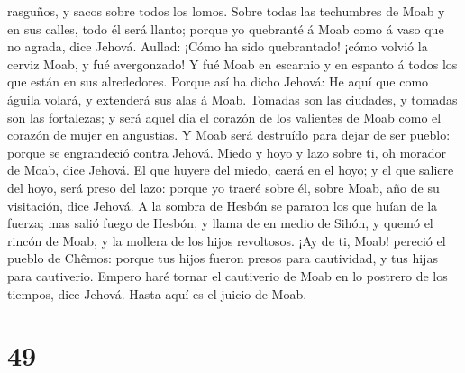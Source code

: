 rasguños, y sacos sobre todos los lomos.  Sobre todas las
techumbres de Moab y en sus calles, todo él será llanto; porque yo
quebranté á Moab como á vaso que no agrada, dice Jehová. 
Aullad: ¡Cómo ha sido quebrantado! ¡cómo volvió la cerviz Moab, y fué
avergonzado! Y fué Moab en escarnio y en espanto á todos los que están
en sus alrededores.  Porque así ha dicho Jehová: He aquí
que como águila volará, y extenderá sus alas á Moab. 
Tomadas son las ciudades, y tomadas son las fortalezas; y será aquel día
el corazón de los valientes de Moab como el corazón de mujer en
angustias.  Y Moab será destruído para dejar de ser
pueblo: porque se engrandeció contra Jehová.  Miedo y
hoyo y lazo sobre ti, oh morador de Moab, dice Jehová. 
El que huyere del miedo, caerá en el hoyo; y el que saliere del hoyo,
será preso del lazo: porque yo traeré sobre él, sobre Moab, año de su
visitación, dice Jehová.  A la sombra de Hesbón se
pararon los que huían de la fuerza; mas salió fuego de Hesbón, y llama
de en medio de Sihón, y quemó el rincón de Moab, y la mollera de los
hijos revoltosos.  ¡Ay de ti, Moab! pereció el pueblo de
Chêmos: porque tus hijos fueron presos para cautividad, y tus hijas para
cautiverio.  Empero haré tornar el cautiverio de Moab en
lo postrero de los tiempos, dice Jehová. Hasta aquí es el juicio de
Moab.

\hypertarget{section-48}{%
\section{49}\label{section-48}}

